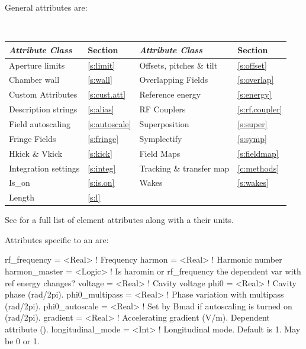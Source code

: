{General  attributes are:
\begin{center}
\tt
\begin{tabular}{llll} \toprule
  {\sl Attribute Class}      & Section            & {\sl Attribute Class}      & Section            \\ \midrule
  Aperture limits            & \ref{s:limit}      & Offsets, pitches \& tilt   & \ref{s:offset}     \\
  Chamber wall               & \ref{s:wall}       & Overlapping Fields         & \ref{s:overlap}    \\
  Custom Attributes          & \ref{s:cust.att}   & Reference energy           & \ref{s:energy}     \\ 
  Description strings        & \ref{s:alias}      & RF Couplers                & \ref{s:rf.coupler} \\
  Field autoscaling          & \ref{s:autoscale}  & Superposition              & \ref{s:super}      \\
  Fringe Fields              & \ref{s:fringe}     & Symplectify                & \ref{s:symp}       \\
  Hkick \& Vkick             & \ref{s:kick}       & Field Maps                 & \ref{s:fieldmap}   \\
  Integration settings       & \ref{s:integ}      & Tracking \& transfer map   & \ref{c:methods}    \\
  Is_on                      & \ref{s:is.on}      & Wakes                      & \ref{s:wakes}      \\
  Length                     & \ref{s:l}          &                            &                    \\
  \bottomrule
\end{tabular}
\end{center}
\toffset
See  for a full list of element attributes along with a their units.

Attributes specific to an  are:
\begin{example}
  rf_frequency    = <Real>    ! Frequency
  harmon          = <Real>    ! Harmonic number
  harmon_master   = <Logic>   ! Is haromin or rf_frequency the dependent var with ref energy changes?
  voltage         = <Real>    ! Cavity voltage
  phi0            = <Real>    ! Cavity phase (rad/2pi).
  phi0_multipass  = <Real>    ! Phase variation with multipass (rad/2pi).
  phi0_autoscale  = <Real>    ! Set by Bmad if autoscaling is turned on (rad/2pi).
  gradient        = <Real>    ! Accelerating gradient (V/m). Dependent attribute ().
  longitudinal_mode = <Int>   ! Longitudinal mode. Default is 1. May be 0 or 1.
\end{example}

}
